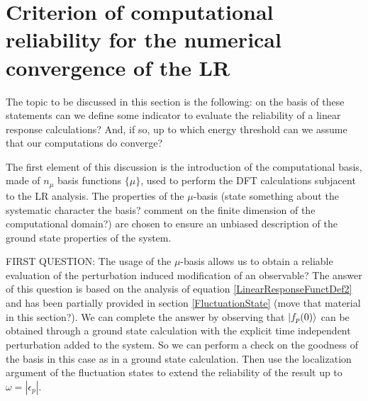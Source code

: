 \documentclass[reprint,aps,prb]{revtex4-1}
\newcommand{\eps}{\epsilon}
\begin{document}
\section{Criterion of computational reliability for the numerical convergence of the LR}

The topic to be discussed in this section is the following: on the basis of these statements can we define some indicator to evaluate the reliability of a linear response calculations? And, 
if so, up to which energy threshold can we assume that our computations do converge?

The first element of this discussion is the introduction of the computational basis, made of $n_\mu$ basis functions $\{\mu\}$, used to perform the DFT calculations subjacent to the LR analysis. 
The properties of the $\mu$-basis (state something about the systematic character the basis? comment on the finite dimension of the computational domain?) are chosen to ensure an unbiased description 
of the ground state properties of the system. 

FIRST QUESTION: The usage of the $\mu$-basis allows us to obtain a reliable evaluation of the perturbation induced modification of an observable? 
The answer of this question is based on the analysis of equation \eqref{LinearResponseFunctDef2} and has been partially provided in section \ref{FluctuationState} (move that material in this section?). 
We can complete the answer by observing that $\ket{f_p(0)}$ can be obtained through a ground state calculation with the explicit time independent perturbation added to the system. So we can perform
a check on the goodness of the basis in this case as in a ground state calculation. Then use the localization argument of the fluctuation states to extend the reliability of the result up to
$\omega=|\eps_p|$. 
\end{document}
